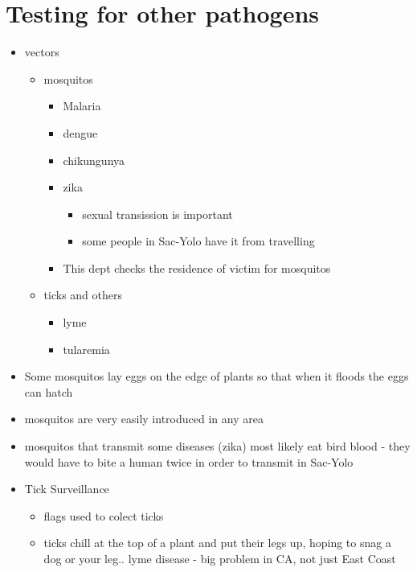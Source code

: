 \documentclass{article}
\begin{document}
    \section{Testing for other pathogens}
    \begin{itemize}
        \item vectors
        \begin{itemize}
            \item mosquitos
            \begin{itemize}
                \item Malaria
                \item dengue
                \item chikungunya
                \item zika
                \begin{itemize}
                    \item sexual transission is important
                    \item some people in Sac-Yolo have it from travelling
                \end{itemize}
                \item This dept checks the residence of victim for mosquitos
            \end{itemize}
            \item ticks and others
            \begin{itemize}
                \item lyme
                \item tularemia
            \end{itemize}
        \end{itemize}
        \item Some mosquitos lay eggs on the edge of plants so that when it floods the eggs can hatch
        \item mosquitos are very easily introduced in any area
        \item mosquitos that transmit some diseases (zika) most likely eat bird blood - they would have to bite a human twice in order to transmit in Sac-Yolo
        \item Tick Surveillance
        \begin{itemize}
            \item flags used to colect ticks
            \item ticks chill at the top of a plant and put their legs up, hoping to snag a dog or your leg.. lyme disease - big problem in CA, not just East Coast

\end{itemize}
\end{itemize}
\end{document}
